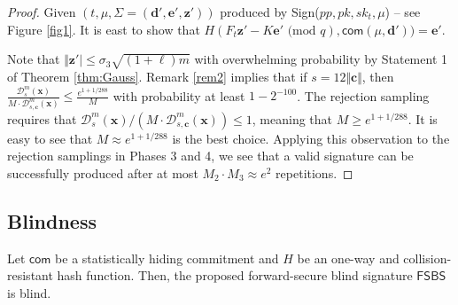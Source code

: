 \documentclass[runningheads]{llncs}
\begin{document}
\begin{proof} 
Given $(t,\mu,\Sigma= (\mathbf{d}', \mathbf{e}', \mathbf{z}'))$
produced by \textsf{Sign}($pp,pk, sk_t,\mu$) -- see Figure \ref{fig1}.
It is east to show that 
$H(F_t\mathbf{z}' -K\mathbf{e}'\text{ (mod } q), \mathsf{com}(\mu, \mathbf{d}'))=\mathbf{e}'$. 
\iffalse
Indeed, using the fact $K=F_t\cdot S_t$, we have 
	\begin{align*} F_t\mathbf{z}' -K\mathbf{e}'\text{ (mod } q)&=F_t(\mathbf{z}+\mathbf{a}) -K(\mathbf{e}-\mathbf{b})\text{ (mod } q)\\
	&=F_t\mathbf{z}+F_t\mathbf{a} -K\mathbf{e}+K\mathbf{b}\text{ (mod } q)\\&=F_t(\mathbf{r}+S_t\mathbf{e})+F_t\mathbf{a} -K\mathbf{e}+K\mathbf{b}\text{ (mod } q)\\
	&=F_t\mathbf{r}+F_t\mathbf{a} +K\mathbf{b}\text{ (mod } q)\\
	&=\mathbf{x}+F_t\mathbf{a}+K\mathbf{b} \text{ (mod } q).
	\end{align*}	
	\fi 
Note that $\Vert \mathbf{z}'\vert \leq \sigma_3\sqrt{(1+\ell)m}$ with overwhelming probability 
by Statement 1 of Theorem \ref{thm:Gauss}. 
Remark \ref{rem2} implies that if $s=12\Vert  \mathbf{c}\Vert$, 
then 
$	\frac{\mathcal{D}_{s}^m(\mathbf{x})}{M \cdot \mathcal{D}^m_{s, \mathbf{c}}(\mathbf{x})} \leq \frac{e^{1+1/288}}{M}$
with probability at least $1-2^{-100}$.
The rejection sampling requires that $\mathcal{D}_{s}^m(\mathbf{x})/(M \cdot \mathcal{D}^m_{s,\mathbf{c}}(\mathbf{x}))\leq 1$, 
meaning that $M \geq e^{1+1/288}$. It is easy to see that $M\approx e^{1+1/288}$ is the best choice. 
Applying this observation to the rejection samplings in Phases 3 and 4, 
we  see that a valid signature can be successfully produced after at most $M_2\cdot M_3 \approx e^2$ repetitions.
\end{proof}

\subsection{Blindness}

\begin{theorem}[Blindness] \label{blindness} 
Let  $\mathsf{com}$ be a statistically hiding commitment and $H$ be an one-way and collision-resistant hash function.  
Then, the proposed forward-secure blind signature $\mathsf{FSBS}$ is blind.
\end{theorem}
\end{document}
